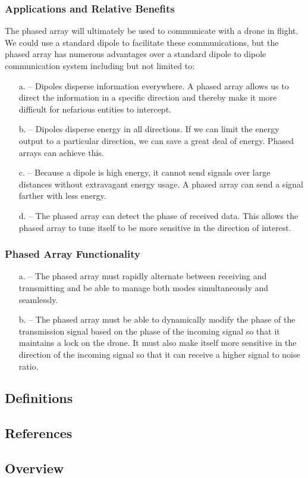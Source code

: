 \documentclass[ProjectRequirements.tex]{subfiles}
\begin{document}
		\subsubsection{Applications and Relative Benefits}
			The phased array will ultimately be used to communicate with a drone in flight. We could use a standard dipole to facilitate these communications, but the phased array has numerous advantages over a standard dipole to dipole communication system including but not limited to:
			\begin{itemize}
				\item[a.]	 -- Dipoles disperse information everywhere. A phased array allows us to direct the information in a specific direction and thereby make it more difficult for nefarious entities to intercept.
				\item[b.] 	 -- Dipoles disperse energy in all directions. If we can limit the energy output to a particular direction, we can save a great deal of energy. Phased arrays can achieve this.
				\item[c.] 	 -- Because a dipole is high energy, it cannot send signals over large distances without extravagant energy usage. A phased array can send a signal farther with less energy.
 				\item[d.] 	 -- The phased array can detect the phase of received data. This allows the phased array to tune itself to be more sensitive in the direction of interest.
			\end{itemize}
		\subsubsection{Phased Array Functionality}
			\begin{itemize}
				\item[a.]	 -- The phased array must rapidly alternate between receiving and transmitting and be able to manage both modes simultaneously and seamlessly.
				\item[b.] 	 -- The phased array must be able to dynamically modify the phase of the transmission signal based on the phase of the incoming signal so that it maintains a lock on the drone. It must also make itself more sensitive in the direction of the incoming signal so that it can receive a higher signal to noise ratio.
			\end{itemize}
	\subsection{Definitions}
	\subsection{References}
	\subsection{Overview}
\end{document}
